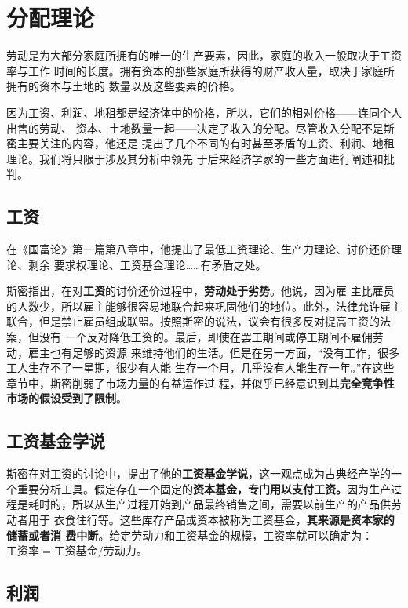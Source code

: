 \section{分配理论}

劳动是为大部分家庭所拥有的唯一的生产要素，因此，家庭的收入一般取决于工资率与工作
时间的长度。拥有资本的那些家庭所获得的财产收入量，取决于家庭所拥有的资本与土地的
数量以及这些要素的价格。

因为工资、利润、地租都是经济体中的价格，所以，它们的相对价格——连同个人出售的劳动、
资本、土地数量一起——决定了收入的分配。尽管收入分配不是斯密主要关注的内容，他还是
提出了几个不同的有时甚至矛盾的工资、利润、地租理论。我们将只限于涉及其分析中领先
于后来经济学家的一些方面进行阐述和批判。

\subsection{工资}

在《国富论》第一篇第八章中，他提出了最低工资理论、生产力理论、讨价还价理论、剩余
要求权理论、工资基金理论……有矛盾之处。

斯密指出，在对\textbf{工资}的讨价还价过程中，\textbf{劳动处于劣势}。他说，因为雇
主比雇员的人数少，所以雇主能够很容易地联合起来巩固他们的地位。此外，法律允许雇主
联合，但是禁止雇员组成联盟。按照斯密的说法，议会有很多反对提高工资的法案，但没有
一个反对降低工资的。最后，即使在罢工期间或停工期间不雇佣劳动，雇主也有足够的资源
来维持他们的生活。但是在另一方面，“没有工作，很多工人生存不了一星期，很少有人能
生存一个月，几乎没有人能生存一年。”在这些章节中，斯密削弱了市场力量的有益运作过
程，并似乎已经意识到其\textbf{完全竞争性市场的假设受到了限制}。

\subsection{工资基金学说}

斯密在对工资的讨论中，提出了他的\textbf{工资基金学说}，这一观点成为古典经产学的一
个重要分析工具。假定存在一个固定的\textbf{资本基金，专门用以支付工资。}因为生产过
程是耗时的，所以从生产过程开始到产品最终销售之间，需要以前生产的产品供劳动者用于
衣食住行等。这些库存产品或资本被称为工资基金，\textbf{其来源是资本家的储蓄或者消
  费中断}。给定劳动力和工资基金的规模，工资率就可以确定为：$工资率=工资基金/劳动
力$。

\subsection{利润}

